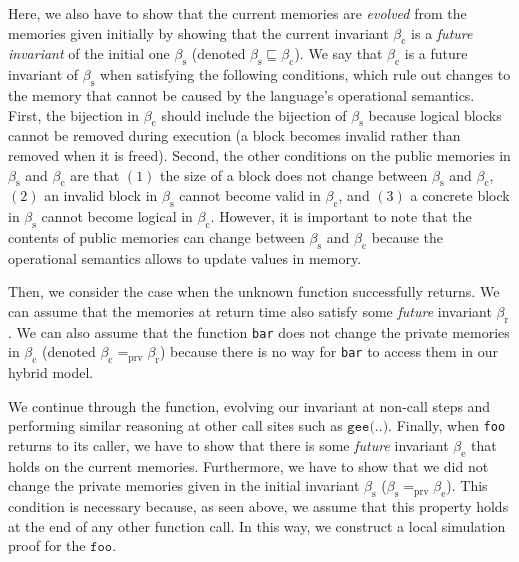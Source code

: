 Here, we also have to show that the current memories are
\emph{evolved} from the memories given initially by showing that the
current invariant $\beta_\textrm{c}$ is a \emph{future invariant} of
the initial one ${\beta_\textrm{s}}$ 
(denoted ${\beta_\textrm{s}}\sqsubseteq\beta_\textrm{c}$).
We say that $\beta_\textrm{c}$ is a future invariant of 
${\beta_\textrm{s}}$ when satisfying the following conditions,
which rule out changes to the memory that cannot be caused 
by the language's operational semantics.  
First, the bijection in
$\beta_\textrm{c}$ should include the bijection of ${\beta_\textrm{s}}$ because
logical blocks cannot be removed during execution (a block
becomes invalid rather than removed when it is freed).  Second, the other
conditions on the public memories in ${\beta_\textrm{s}}$ and
$\beta_\textrm{c}$ are that $(1)$ the size of a block does not change
between ${\beta_\textrm{s}}$ and $\beta_\textrm{c}$, $(2)$ an
invalid block in ${\beta_\textrm{s}}$ cannot become valid in
$\beta_\textrm{c}$, and $(3)$ a concrete block in
${\beta_\textrm{s}}$ cannot become logical in $\beta_\textrm{c}$.
However, it is important to note that the contents of public memories
can change between ${\beta_\textrm{s}}$ and $\beta_\textrm{c}$ because
the operational semantics allows
to update values in memory.

Then, we consider the case when the unknown function successfully
returns. We can assume that the memories at return time also satisfy some
\emph{future} invariant ${\beta_\textrm{r}}$. We can also
assume that the function \texttt{bar} does not change the private
memories in $\beta_\textrm{c}$ (denoted $\beta_\textrm{c}
=_{\textrm{prv}} {\beta_\textrm{r}}$) because there is no way
for \texttt{bar} to access them in our hybrid model.

We continue through the function, evolving our invariant at non-call steps and performing similar reasoning at other call sites
such as $\texttt{gee(..)}$.  Finally, when \texttt{foo} returns to its caller, we have to
show that there is some \emph{future} invariant $\beta_\textrm{e}$
that holds on the current memories. Furthermore, we have to show that
we did not change the private memories given in
 the initial invariant $\beta_\textrm{s}$ (\ie $\beta_\textrm{s} =_{\textrm{prv}}
\beta_\textrm{e}$). This condition is necessary because, as seen above, we assume that this property holds at the end of any other function call.
In this way, we construct a local simulation proof for the $\texttt{foo}$.


